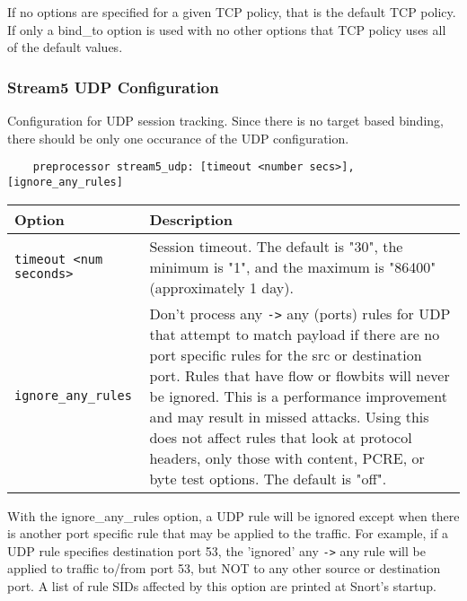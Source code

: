 \documentclass[english]{report}
\newenvironment{note}{
\samepage
    \vspace{10pt}{\textsf{
        {\hspace{7pt}\Huge{$\triangle$\hspace{-12.5pt}{\Large{$^!$}}}}\hspace{5pt}
        {\Large{NOTE}}
    }
    }
   \begin{center}
    \par\vspace{-17pt}

    \begin{lrbox}{\savepar}
    \begin{minipage}[r]{6in}
}
{
    \end{minipage}
    \end{lrbox}
    \fbox{
        \usebox{
            \savepar
	}
    }
    \par\vskip10pt
    \end{center}
}
\newenvironment{note}{
        \begin{rawhtml}
        <p><table border="1"><tr><td><b>
        Note:&nbsp;&nbsp;</b>
        \end{rawhtml}
}{
        \begin{rawhtml}
        </b></td></tr></table></p>
        \end{rawhtml}
}
\begin{document}
\begin{note}

If no options are specified for a given TCP policy, that is the default TCP
policy.  If only a bind\_to option is used with no other options that TCP
policy uses all of the default values.

\end{note}

\subsubsection{Stream5 UDP Configuration}

Configuration for UDP session tracking.  Since there is no target based
binding, there should be only one occurance of the UDP configuration.

\begin{verbatim}
    preprocessor stream5_udp: [timeout <number secs>], [ignore_any_rules]
\end{verbatim}

\begin{center}
\begin{tabular}{| l | p{4.5in} |}

\hline
\textbf{Option} & \textbf{Description}\\
\hline 

\hline 
\texttt{timeout <num seconds>} &

Session timeout.  The default is "30", the minimum is "1", and the maximum is
"86400" (approximately 1 day).\\

\hline
\texttt{ignore\_any\_rules} &

Don't process any \texttt{->} any (ports) rules for UDP that attempt to match
payload if there are no port specific rules for the src or destination port.
Rules that have flow or flowbits will never be ignored.  This is a performance
improvement and may result in missed attacks.  Using this does not affect rules
that look at protocol headers, only those with content, PCRE, or byte test
options.  The default is "off".\\

\hline
\end{tabular}
\end{center}

\begin{note}

With the ignore\_any\_rules option, a UDP rule will be ignored except when
there is another port specific rule that may be applied to the traffic.  For
example, if a UDP rule specifies destination port 53, the 'ignored' any
\texttt{->} any rule will be applied to traffic to/from port 53, but NOT to any
other source or destination port.  A list of rule SIDs affected by this option
are printed at Snort's startup.

\end{note}
\end{document}
